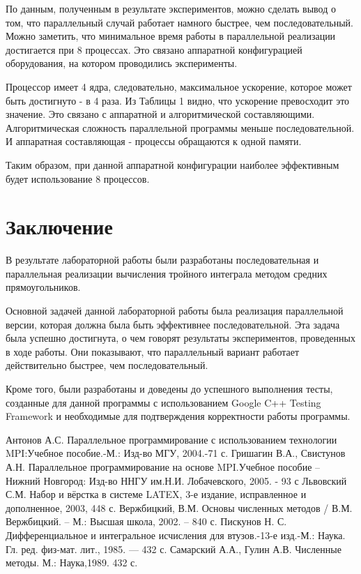 \documentclass{report}
\begin{document}
\par По данным, полученным в результате экспериментов, можно сделать вывод о том, что параллельный случай работает намного быстрее, чем последовательный. Можно заметить, что минимальное время работы в параллельной реализации достигается при 8 процессах. Это связано аппаратной конфигурацией оборудования, на котором проводились эксперименты. 
\par Процессор имеет 4 ядра, следовательно, максимальное ускорение, которое может быть достигнуто - в 4 раза. Из Таблицы 1 видно, что ускорение превосходит это значение. Это связано с аппаратной и алгоритмической составляющими. Алгоритмическая сложность параллельной программы меньше последовательной. И аппаратная составляющая - процессы обращаются к одной памяти.
\par Таким образом, при данной аппаратной конфигурации наиболее эффективным будет использование 8 процессов.

\newpage

\section*{Заключение}
В результате лабораторной работы были разработаны последовательная и параллельная реализации вычисления тройного интеграла методом средних прямоугольников.
\par Основной задачей данной лабораторной работы была реализация параллельной версии, которая должна была быть эффективнее последовательной. Эта задача была успешно достигнута, о чем говорят результаты экспериментов, проведенных в ходе работы. Они показывают, что параллельный вариант работает действительно быстрее, чем последовательный. 
\par Кроме того, были разработаны и доведены до успешного выполнения тесты, созданные для данной программы с использованием Google C++ Testing Framework и необходимые для подтверждения корректности работы программы.
\newpage

\begin{thebibliography}{1}
 Антонов А.С. Параллельное программирование с использованием технологии MPI:Учебное пособие.-М.: Изд-во МГУ, 2004.-71 с.
 Гришагин В.А., Свистунов А.Н. Параллельное программирование на основе MPI.Учебное пособие – Нижний Новгород: Изд-во ННГУ им.Н.И. Лобачевского, 2005. - 93 с
 Львовский С.М. Набор и вёрстка в системе LATEX, 3-е издание, исправленное и дополненное, 2003, 448 с. 
 Вержбицкий, В.М. Основы численных методов / В.М. Вержбицкий. – М.:
Высшая школа, 2002. – 840 с.
 Пискунов Н. С. Дифференциальное и интегральное исчисления для
втузов.-13-е изд.-М.: Наука. Гл. ред. физ-мат. лит., 1985. — 432 с.
 Самарский А.А., Гулин А.В. Численные методы. М.: Наука,1989. 432 с.
\end{thebibliography}
\newpage
\end{document}
